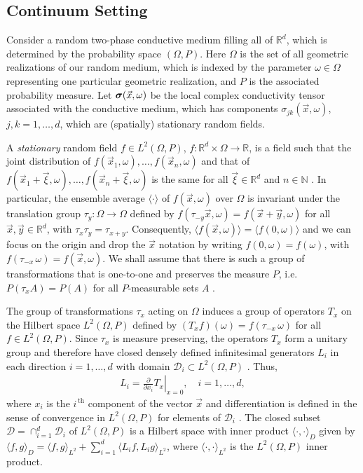 \documentclass{cmslatex}
\newcommand\bsig{\mbox{\boldmath${\sigma}$}}
\begin{document}
\subsection{Continuum Setting}\label{sec:Continuum_Setting}
%
Consider a random two-phase conductive medium filling all of
$\mathbb{R}^d$, which is determined by the probability space
$(\Omega,P)$. Here $\Omega$ is the set of all  geometric realizations of our
random medium, which is indexed by the parameter $\omega\in\Omega$ representing
one particular geometric realization, and $P$ is the associated
probability measure. Let $\bsig(\vec{x},\omega)$ be the local complex
conductivity tensor associated with the conductive medium, which has 
components $\sigma_{jk}(\vec{x},\omega)$, $j,k=1,\ldots,d$, which are (spatially)
stationary random fields.


A \emph{stationary} random field $f\in L^2(\Omega,P)$,
$f:\mathbb{R}^d\times\Omega\to\mathbb{R}$, is a field such that the 
joint distribution of $f(\vec{x}_1,\omega),\ldots,f(\vec{x}_n,\omega)$ and that of
$f(\vec{x}_1+\vec{\xi},\omega),\ldots,f(\vec{x}_n+\vec{\xi},\omega)$ is the same for all
$\vec{\xi}\in\mathbb{R}^d$ and $n\in\mathbb{N}$ \cite{Golden:CMP-473}. In
particular, the ensemble average $\langle\cdot\rangle$ of $f(\vec{x},\omega)$ over $\Omega$ is
invariant under the translation group $\tau_y:\Omega\to\Omega$ defined by
$f(\tau_{-y}\vec{x},\omega)=f(\vec{x}+\vec{y},\omega)$ for all
$\vec{x},\vec{y}\in\mathbb{R}^d$, with $\tau_x\tau_y=\tau_{x+y}$. Consequently, 
$\langle f(\vec{x},\omega)\rangle=\langle f(0,\omega)\rangle$ and we can focus on the origin and drop the
$\vec{x}$ notation by writing $f(0,\omega)=f(\omega)$, with
$f(\tau_{-x}\,\omega)=f(\vec{x},\omega)$. We shall assume that there is such a group
of transformations that is one-to-one and preserves the measure $P$,
i.e. $P(\tau_xA)=P(A)$ for all $P$-measurable sets $A$
\cite{Golden:CMP-473,Papanicolaou:RF-835}.

The group of transformations $\tau_x$ acting on $\Omega$ induces a group of
operators $T_x$ on the Hilbert space $L^2(\Omega,P)$ defined by
$(T_xf)(\omega)=f(\tau_{-x}\,\omega)$ for all $f\in L^2(\Omega,P)$. Since $\tau_x$ is measure
preserving, the operators $T_x$ form a unitary group and therefore
have closed densely defined infinitesimal generators $L_i$ in each
direction $i=1,\ldots,d$ with domain $\mathscr{D}_i\subset L^2(\Omega,P)$
\cite{Golden:CMP-467,Papanicolaou:RF-835}. Thus,  
%
\begin{align*}
  L_i=\left.\frac{\partial}{\partial x_i}T_x \right|_{x=0}, \quad i=1,\ldots,d,
\end{align*}
%
where $x_i$
is the $i^{\,\text{th}}$ component of the vector
$\vec{x}$ and differentiation is defined in the sense of convergence
in $L^2(\Omega,P)$ for elements of $\mathscr{D}_i$
\cite{Golden:CMP-467}. The closed subset
$\mathscr{D}=\cap_{i=1}^d\mathscr{D}_i$ of $L^2(\Omega,P)$ is a Hilbert space
\cite{Golden:CMP-467} with inner product $\langle \cdot,\cdot\rangle_D$ given by  $\langle
f,g\rangle_D=\langle f,g\rangle_{L^2}+\sum_{i=1}^d\langle L_if,L_ig\rangle_{L^2}$, where $\langle\cdot,\cdot\rangle_{L^2}$
is the $L^2(\Omega,P)$ inner product. 
\end{document}
